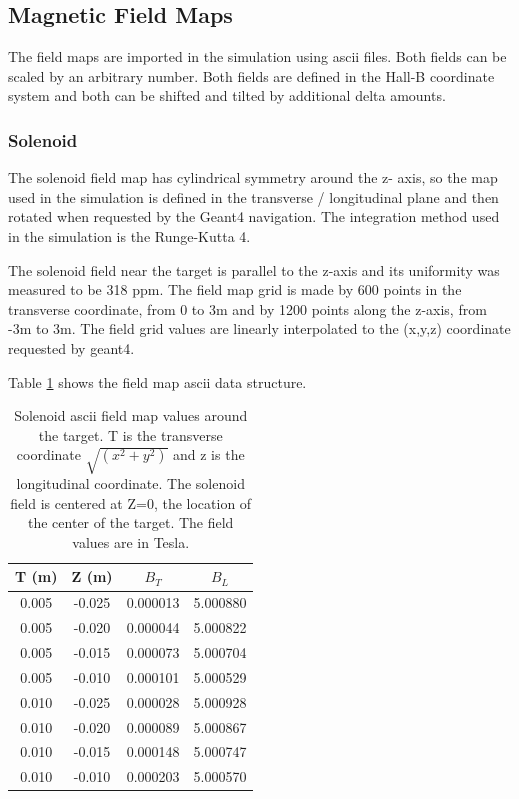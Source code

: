 \subsection{Magnetic Field Maps} \label{clas12FieldMaps}


The field maps are imported in the simulation using ascii files. Both fields can be scaled by an arbitrary number.
Both fields are defined in the Hall-B coordinate system and both can be shifted and tilted by additional delta amounts.

\subsubsection{Solenoid}
The solenoid field map has cylindrical symmetry around the z- axis, so the map used in the simulation is defined in the transverse / longitudinal plane
and then rotated when requested by the Geant4 navigation. The integration method used in the simulation is the Runge-Kutta 4.

The solenoid field near the target is parallel to the z-axis and its uniformity was measured to be 318 ppm.
The field map grid is made by 600 points
in the transverse coordinate, from 0 to 3m and by 1200 points along the z-axis, from \mbox{-3m} to 3m.
The field grid values are linearly interpolated to the (x,y,z) coordinate requested by geant4.

Table \ref{tab:solMap} shows the field map ascii data structure.


\begin{table}[h]
	\begin{center}
		\begin{tabular}{| c | c | c | c |}
			T (m)  & Z (m) &  $B_T $  & $ B_L $ \\
			\hline
          0.005  &  -0.025 & 0.000013  & 5.000880 \\
          0.005  &  -0.020 & 0.000044  & 5.000822 \\
          0.005  &  -0.015 & 0.000073  & 5.000704 \\
          0.005  &  -0.010 & 0.000101  & 5.000529 \\
          0.010  &  -0.025 & 0.000028  & 5.000928 \\
          0.010  &  -0.020 & 0.000089  & 5.000867 \\
          0.010  &  -0.015 & 0.000148  & 5.000747 \\
          0.010  &  -0.010 & 0.000203  & 5.000570 \\
		\end{tabular}
	\end{center}
\caption{Solenoid ascii field map values around the target. T is the transverse coordinate $\sqrt{(x^2+y^2)}$ and z is the longitudinal coordinate.
            The solenoid field is centered at Z=0, the location of the center of the target. The field values are in Tesla.}\label{tab:solMap}
\end{table}

